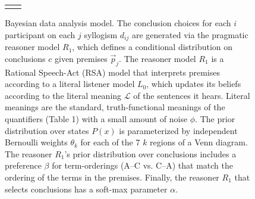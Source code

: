 \documentclass[floatsintext, doc]{apa6}
\begin{document}
\begin{figure}[ht!]
\begin{center}
\begin{tabular}{cc}
\begin{tikzpicture}
%


\end{tikzpicture}

    \end{tabular}
  \end{center}
  \caption{\small Bayesian data analysis model. The conclusion choices for each $i$ participant on each $j$ syllogism $d_{ij}$ are generated via the pragmatic reasoner model $R_1$, which defines a conditional distribution on conclusions $c$ given premises $\vec{p}_j$. The reasoner model $R_1$ is a Rational Speech-Act (RSA) model that interprets premises according to a literal listener model $L_0$, which updates its beliefs according to the literal meaning $\mathcal{L}$ of the sentences it hears. Literal meanings are the standard, truth-functional meanings of the quantifiers (Table 1\label{tab:sem}) with a small amount of noise $\phi$. The prior distribution over states $P(x)$ is parameterized by independent Bernoulli weights $\theta_k$ for each of the 7 $k$ regions of a Venn diagram. The reasoner $R_1$'s prior distribution over conclusions includes a preference $\beta$ for term-orderings (A--C vs. C--A) that match the ordering of the terms in the premises. Finally, the reasoner $R_1$ that selects conclusions has a soft-max parameter $\alpha$.}
  \label{fig:bayesnet}
\end{figure}
\end{document}
